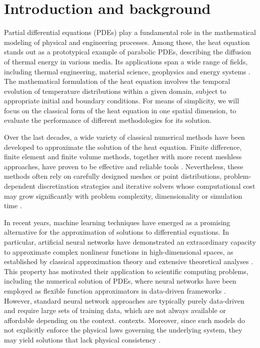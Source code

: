 \documentclass[final,1p,times]{elsarticle}
\theoremstyle{definition}
\begin{document}


\section{Introduction and background}

Partial differential equations (PDEs) play a fundamental role in the mathematical modeling of physical and engineering processes. Among these, the heat equation stands out as a prototypical example of parabolic PDEs, describing the diffusion of thermal energy in various media. Its applications span a wide range of fields, including thermal engineering, material science, geophysics and energy systems \cite{Wang2023Concrete,Yu2024Slab,Kumar2023AnnularFin}. The mathematical formulation of the heat equation involves the temporal evolution of temperature distributions within a given domain, subject to appropriate initial and boundary conditions. For means of simplicity, we will focus on the classical form of the heat equation in one spatial dimension, to evaluate the performance of different methodologies for its solution.

Over the last decades, a wide variety of classical numerical methods have been developed to approximate the solution of the heat equation. Finite difference, finite element and finite volume methods, together with more recent meshless approaches, have proven to be effective and reliable tools \cite{Sharma2014FEM,Miotti2021MeshlessHeat}. Nevertheless, these methods often rely on carefully designed meshes or point distributions, problem-dependent discretization strategies and iterative solvers whose computational cost may grow significantly with problem complexity, dimensionality or simulation time \cite{Patel2020MeshlessReview,Tadmor2012PDEReview}.

In recent years, machine learning techniques have emerged as a promising alternative for the approximation of solutions to differential equations. In particular, artificial neural networks have demonstrated an extraordinary capacity to approximate complex nonlinear functions in high-dimensional spaces, as established by classical approximation theory and extensive theoretical analyses \cite{Most2005NNApprox,DeVore2021NNApproxSurvey}. This property has motivated their application to scientific computing problems, including the numerical solution of PDEs, where neural networks have been employed as flexible function approximators in data-driven frameworks \cite{Zha2022NNPDEReview,Nuugulu2025DataDrivenPDE}. However, standard neural network approaches are typically purely data-driven and require large sets of training data, which are not always available or affordable depending on the context. contexts. Moreover, since such models do not explicitly enforce the physical laws governing the underlying system, they may yield solutions that lack physical consistency \cite{Farea2024PINNChallenges,Liu2025NaturePINNs}.
\end{document}
